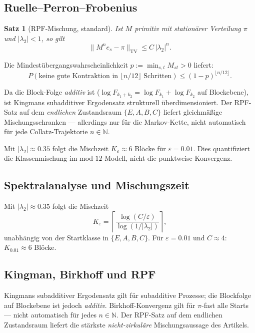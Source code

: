 \documentclass[12pt,a4paper]{article}
\newtheorem{satz}{Satz}[section]
\newcommand{\N}{\mathbb{N}}
\newcommand{\TV}{\mathrm{TV}}
\begin{document}
\subsection{Ruelle--Perron--Frobenius}

\begin{satz}[RPF-Mischung, standard]
Ist $M$ primitiv mit stationärer Verteilung $\pi$ und $|\lambda_2| < 1$, so gilt
\[
  \|M^n e_s - \pi\|_{\TV} \leq C\,|\lambda_2|^n.
\]
\end{satz}

Die Mindestübergangswahrscheinlichkeit $p := \min_{s,t} M_{st} > 0$ liefert:
\[
  P(\text{keine gute Kontraktion in } \lfloor n/12 \rfloor \text{ Schritten})
  \leq (1-p)^{\lfloor n/12 \rfloor}.
\]

\begin{tcolorbox}[kern]
Da die Block-Folge \emph{additiv} ist ($\log F_{k_1+k_2} = \log F_{k_1} + \log F_{k_2}$
auf Blockebene), ist Kingmans subadditiver Ergodensatz strukturell
überdimensioniert. Der RPF-Satz auf dem \emph{endlichen} Zustandsraum
$\{E,A,B,C\}$ liefert gleichmäßige Mischungsschranken --- allerdings nur
für die Markov-Kette, nicht automatisch für jede Collatz-Trajektorie
$n \in \N$.
\end{tcolorbox}

Mit $|\lambda_2| \approx 0.35$ folgt die Mischzeit
$K_\varepsilon \approx 6$ Blöcke für $\varepsilon = 0.01$.
Dies quantifiziert die Klassenmischung im mod-$12$-Modell, nicht die
punktweise Konvergenz.

\subsection{Spektralanalyse und Mischungszeit}

Mit $|\lambda_2| \approx 0.35$ folgt die Mischzeit
\[
  K_\varepsilon = \left\lceil\frac{\log(C/\varepsilon)}{\log(1/|\lambda_2|)}\right\rceil,
\]
unabhängig von der Startklasse in $\{E,A,B,C\}$.
Für $\varepsilon = 0.01$ und $C \approx 4$: $K_{0.01} \approx 6$ Blöcke.

\subsection{Kingman, Birkhoff und RPF}

Kingmans subadditiver Ergodensatz gilt für subadditive Prozesse; die
Blockfolge auf Blockebene ist jedoch \emph{additiv}. Birkhoff-Konvergenz
gilt für $\pi$-fast alle Starts --- nicht automatisch für jedes $n \in \N$.
Der RPF-Satz auf dem endlichen Zustandsraum liefert die stärkste
\emph{nicht-zirkuläre} Mischungsaussage des Artikels.
\end{document}
